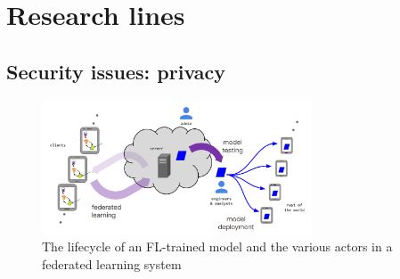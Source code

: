 \documentclass{article}
\begin{document}
\section{Research lines}

\subsection{Security issues: privacy}
\begin{figure}[!ht]
    \centering
    \includegraphics[width=8cm]{assets/structureFL.PNG}
    \caption{The lifecycle of an FL-trained model and the various actors in a federated learning system}
    \label{ Structure FL}
\end{figure}
\end{document}

